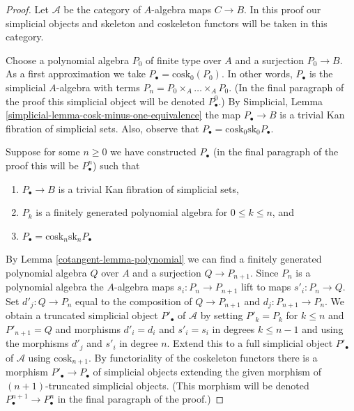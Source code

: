 \begin{proof}

Let $\mathcal{A}$ be the category of $A$-algebra maps $C \to B$.
In this proof our simplicial objects and skeleton and coskeleton
functors will be taken in this category.

\medskip\noindent
Choose a polynomial algebra $P_0$ of finite type over $A$ and a surjection
$P_0 \to B$. As a first approximation we take
$P_\bullet = \text{cosk}_0(P_0)$. In other words, $P_\bullet$ is the simplicial
$A$-algebra with terms $P_n = P_0 \times_A \ldots \times_A P_0$.
(In the final paragraph of the proof this simplicial object will
be denoted $P^0_\bullet$.) By
Simplicial, Lemma \ref{simplicial-lemma-cosk-minus-one-equivalence}
the map $P_\bullet \to B$ is a trivial Kan fibration of simplicial sets.
Also, observe that $P_\bullet = \text{cosk}_0 \text{sk}_0 P_\bullet$.

\medskip\noindent
Suppose for some $n \geq 0$ we have constructed $P_\bullet$
(in the final paragraph of the proof this will be $P^n_\bullet$)
such that
\begin{enumerate}
\item[(a)] $P_\bullet \to B$ is a trivial Kan fibration of simplicial sets,
\item[(b)] $P_k$ is a finitely generated polynomial algebra for
$0 \leq k \leq n$, and
\item[(c)] $P_\bullet = \text{cosk}_n \text{sk}_n P_\bullet$
\end{enumerate}
By Lemma \ref{cotangent-lemma-polynomial}
we can find a finitely generated polynomial algebra $Q$ over $A$
and a surjection $Q \to P_{n + 1}$. Since $P_n$ is a polynomial algebra
the $A$-algebra maps $s_i : P_n \to P_{n + 1}$ lift to maps
$s'_i : P_n \to Q$. Set $d'_j : Q \to P_n$ equal to the composition of
$Q \to P_{n + 1}$ and $d_j : P_{n + 1} \to P_n$.
We obtain a truncated simplicial object $P'_\bullet$ of $\mathcal{A}$
by setting $P'_k = P_k$ for $k \leq n$ and $P'_{n + 1} = Q$ and morphisms
$d'_i = d_i$ and $s'_i = s_i$ in degrees $k \leq n - 1$ and using the
morphisms $d'_j$ and $s'_i$ in degree $n$. Extend this to a full simplicial
object $P'_\bullet$ of $\mathcal{A}$ using $\text{cosk}_{n + 1}$. By
functoriality of the coskeleton functors there is a morphism
$P'_\bullet \to P_\bullet$ of simplicial objects extending the
given morphism of $(n + 1)$-truncated simplicial objects.
(This morphism will be denoted $P^{n + 1}_\bullet \to P^n_\bullet$
in the final paragraph of the proof.)


\end{proof}
